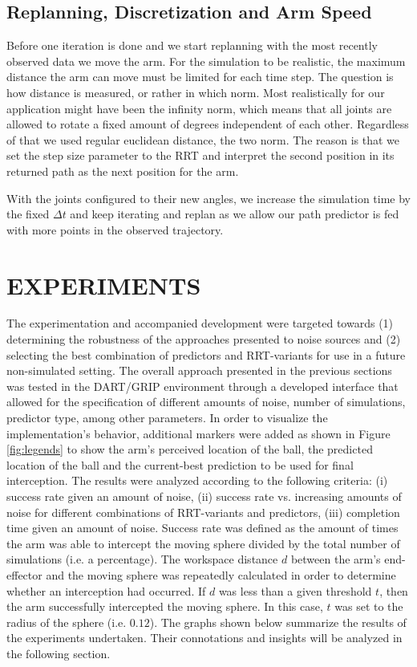 \documentclass[letterpaper, 10 pt, conference]{ieeeconf}  %
\begin{document}
\subsection{Replanning, Discretization and Arm Speed}

Before one iteration is done and we start replanning with the most recently
observed data we move the arm. For the simulation to be realistic, the  maximum
distance the arm can move must be limited for each time step. The question is
how distance is measured, or rather in which norm. Most realistically for our
application might have been the infinity norm, which means that all joints are
allowed to rotate a fixed amount of degrees independent of each other.
Regardless of that we used regular euclidean distance, the two norm. The reason
is that we set the step size parameter to the RRT and interpret the second
position in its returned path as the next position for the arm.

With the joints configured to their new angles, we increase the
simulation time by the fixed $\Delta t$ and keep iterating and replan as
we allow our path predictor is fed with more points in the observed trajectory.

\section{EXPERIMENTS}

The experimentation and accompanied development were targeted towards
(1) determining the robustness of the approaches presented to noise
sources and (2) selecting the best combination of predictors and
RRT-variants for use in a future non-simulated setting. The overall
approach presented in the previous sections was tested in the DART/GRIP
environment through a developed interface that allowed for the
specification of different amounts of noise, number of simulations,
predictor type, among other parameters. In order to visualize the
implementation's behavior, additional markers were added as shown in
Figure \ref{fig:legends} to show the arm's perceived location of the
ball, the predicted location of the ball and the current-best prediction
to be used for final interception. The results were analyzed according
to the following criteria: (i) success rate given an amount of noise,
(ii) success rate vs. increasing amounts of noise for different
combinations of RRT-variants and predictors, (iii) completion time given
an amount of noise.  Success rate was defined as the amount of times the
arm was able to intercept the moving sphere divided by the total number
of simulations (i.e. a percentage). The workspace distance $d$ between
the arm's end-effector and the moving sphere was repeatedly calculated
in order to determine whether an interception had occurred. If $d$ was
less than a given threshold $t$, then the arm successfully intercepted
the moving sphere. In this case, $t$ was set to the radius of the sphere
(i.e. $0.12$).  The graphs shown below summarize the results of the
experiments undertaken. Their connotations and insights will be analyzed
in the following section.
\end{document}
